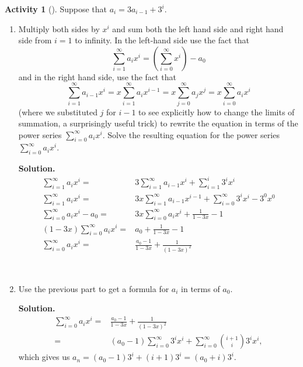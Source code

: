 \documentclass[10pt,]{book}
\theoremstyle{plain}
\theoremstyle{definition}
\newtheorem{activity}[project]{Activity}
\numberwithin{equation}{chapter}
\newcommand{\amp}{&}
\begin{document}
\begin{activity}[]\label{substituteandsolve}
Suppose that \(a_i=3a_{i-1} + 3^i\).%
~\par
\begin{enumerate}[label=(\alph*)]
 \item Multiply both sides by \(x^i\) and sum both the left hand side and right hand side from \(i=1\) to infinity.  In the left-hand side use the fact that%
\begin{equation*}
\sum_{i=1}^\infty a_ix^i = (\sum_{i=0}^\infty x^i) -a_0
\end{equation*}
and in the right hand side, use the fact that%
\begin{equation*}
\sum_{i=1}^\infty a_{i-1}x^i = x\sum_{i=1}^\infty a_ix^{i-1}
=x\sum_{j=0}^\infty a_jx^j =x\sum_{i=0}^\infty a_ix^i
\end{equation*}
(where we substituted \(j\) for \(i-1\) to see explicitly how to change the limits of summation, a surprisingly useful trick) to rewrite the equation in terms of the power series \(\sum_{i=0}^\infty a_ix^i\).  Solve the resulting equation for the power series \(\sum_{i=0}^\infty a_ix^i\).%
\par\medskip\noindent%
\textbf{Solution.}\quad %
\begin{align*}
\sum_{i=1}^\infty a_ix^i  =\amp 3\sum_{i=1}^\infty
a_{i-1}x^i+\sum_{i=1}^i3^ix^i\\
\sum_{i=1}^\infty a_ix^i =\amp 3x\sum_{i=1}^\infty a_{i-1}x^{i-1}+
\sum_{i=0}^\infty 3^ix^i-3^0x^0\\
\sum_{i=0}^\infty a_ix^i -a_0 =\amp 3x\sum_{i=0}^\infty a_{i}x^{i}+
\frac{1}{1-3x}-1\\
(1-3x)\sum_{i=0}^\infty a_ix^i  =\amp a_0+\frac{1}{1-3x} -1\\
\sum_{i=0}^\infty a_ix^i  =\amp \frac{a_0-1}{1-3x}+\frac{1}{(1-3x)^2}
\end{align*}
%

~\par
\item Use the previous part to get a formula for \(a_i\) in terms of \(a_0\).%
\par\medskip\noindent%
\textbf{Solution.}\quad %
\begin{align*}
\sum_{i=0}^\infty a_i x^i  =\amp \frac{a_0-1}{1-3x} + \frac{1}{(1-3x)^2}\\
=\amp (a_0-1)\sum_{i=0}^\infty 3^ix^i +\sum_{i=0}^\infty \binom{i+1}{i}3^ix^i,
\end{align*}
which gives us \(a_n=(a_0-1) 3^i + (i+1)3^i=(a_0+i)3^i\).%


\end{enumerate}
\end{activity}
\end{document}
